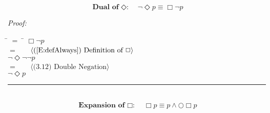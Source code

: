 \documentclass[fleqn, leqno]{article}
\newcommand{\lgap}{2pt}                             %
\newcommand{\mymathindent}{24pt}                      %
\newcommand{\next}{\bigcirc}
\newcommand{\event}{\Diamond}
\newcommand{\always}{\Box}
\newcommand{\myqed}{\hfill\rule[-.23ex]{1.2ex}{2.0ex}}
\newcommand{\Gll} {\langle}                         %
\newcommand{\Ggg} {\rangle}                         %
\newcommand{\Hint}[1]     {\ \ \ $\Gll              \mbox{#1} \Ggg$ }   %
\begin{document}
\begin{equation}\label{E:dualEvent}
\textbf{Dual of $\event$:}\quad \lnot\event p \equiv \always\lnot p
\end{equation}

\emph{Proof:}
\begin{tabbing}
\hspace{\mymathindent} \= $= \;$ \= \kill
  \> \>   $\always\lnot p$\\[\lgap]
  \> $=$  \>  \Hint{(\ref{E:defAlways}) Definition of $\always$}\\[\lgap]
  \> \>   $\lnot\event\lnot\lnot p$\\[\lgap]
  \> $=$  \>  \Hint{(3.12) Double Negation}\\[\lgap]
  \> \>   $\lnot\event p$\\[\lgap]
\end{tabbing}
\myqed\\[\lgap]


\begin{equation}\label{E:expansionAlways}
\textbf{Expansion of $\always$:}\quad \always p \equiv p \land \next\always p
\end{equation}
\end{document}
